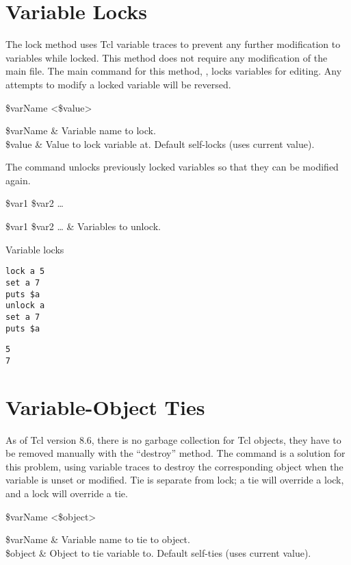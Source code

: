 \documentclass{article}
\renewcommand{\^}[1]{\textsuperscript{#1}}
\renewcommand{\_}[1]{\textsubscript{#1}}
\begin{document}
\section{Variable Locks}
The lock method uses Tcl variable traces to prevent any further modification to variables while locked. This method does not require any modification of the main file. The main command for this method, , locks variables for editing. Any attempts to modify a locked variable will be reversed. 

\begin{syntax}
 \$varName <\$value>
\end{syntax}
\begin{args}
\$varName & Variable name to lock. \\
\$value & Value to lock variable at. Default self-locks (uses current value).
\end{args}

The command  unlocks previously locked variables so that they can be modified again.

\begin{syntax}
 \$var1 \$var2 …
\end{syntax}
\begin{args}
\$var1 \$var2 … & Variables to unlock.
\end{args}

\begin{example}{Variable locks}
\begin{lstlisting}
lock a 5
set a 7
puts $a
unlock a
set a 7
puts $a
\end{lstlisting}
\tcblower
\begin{lstlisting}
5
7
\end{lstlisting}
\end{example}

\clearpage

\section{Variable-Object Ties}
As of Tcl version 8.6, there is no garbage collection for Tcl objects, they have to be removed manually with the ``destroy'' method. 
The command  is a solution for this problem, using variable traces to destroy the corresponding object when the variable is unset or modified. 
Tie is separate from lock; a tie will override a lock, and a lock will override a tie.
\begin{syntax}
 \$varName <\$object>
\end{syntax}
\begin{args}
\$varName & Variable name to tie to object. \\
\$object & Object to tie variable to. Default self-ties (uses current value).
\end{args}
\end{document}

